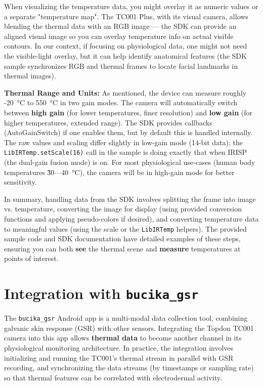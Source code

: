 {When visualizing the temperature data, you might overlay it as numeric
values or a separate "temperature map". The TC001 Plus, with its visual
camera, allows blending the thermal data with an RGB image --- the SDK
can provide an aligned visual image so you can overlay temperature info
on actual visible
contours\cite{Fowles1981}.
In our context, if focusing on physiological data, one might not need
the visible-light overlay, but it can help identify anatomical features
(the SDK sample synchronizes RGB and thermal frames to locate facial
landmarks in thermal
images\cite{MainViewModel}\cite{MainViewModel}).

\textbf{Thermal Range and Units:} As mentioned, the device can measure
roughly -20 °C to 550 °C in two gain
modes\cite{Healey2005}.
The camera will automatically switch between \textbf{high gain} (for lower
temperatures, finer resolution) and \textbf{low gain} (for higher
temperatures, extended range). The SDK provides callbacks
(AutoGainSwitch) if one enables them, but by default this is handled
internally. The raw values and scaling differ slightly in low-gain mode
(14-bit data); the \texttt{LibIRTemp.setScale(16)} call in the sample is doing
exactly that when IRISP (the dual-gain fusion mode) is
on\cite{InstantStressSmartphone2019}.
For most physiological use-cases (human body temperatures \~30---40 °C),
the camera will be in high-gain mode for better sensitivity.

In summary, handling data from the SDK involves splitting the frame into
image vs. temperature, converting the image for display (using provided
conversion functions and applying pseudo-colors if desired), and
converting temperature data to meaningful values (using the scale or the
\texttt{LibIRTemp} helpers). The provided sample code and SDK documentation
have detailed examples of these steps, ensuring you can both \textbf{see} the
thermal scene and \textbf{measure} temperatures at points of interest.

\section{Integration with \texttt{bucika_gsr}}

The \texttt{bucika_gsr} Android app is a multi-modal data collection tool,
combining galvanic skin response (GSR) with other sensors. Integrating
the Topdon TC001 camera into this app allows \textbf{thermal data} to become
another channel in its physiological monitoring architecture. In
practice, the integration involves initializing and running the TC001's
thermal stream in parallel with GSR recording, and synchronizing the
data streams (by timestamps or sampling rate) so that thermal features
can be correlated with electrodermal activity.

}
